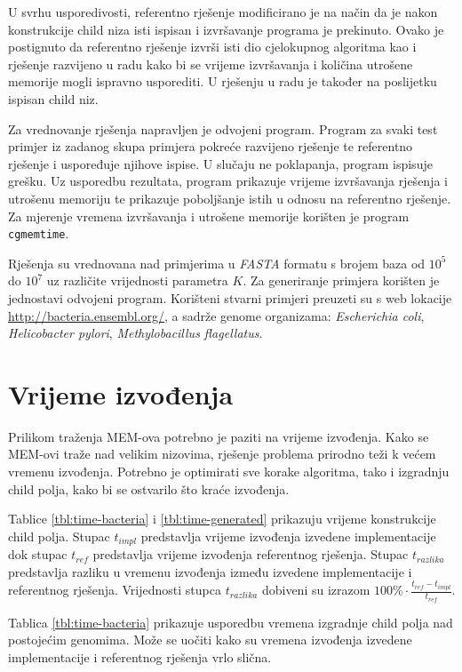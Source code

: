 \documentclass[times, utf8, seminar, numeric]{fer}
\begin{document}
U svrhu usporedivosti, referentno rješenje modificirano je na način da je nakon konstrukcije child niza isti ispisan i izvršavanje programa je prekinuto. Ovako je postignuto da referentno rješenje izvrši isti dio cjelokupnog algoritma kao i rješenje razvijeno u radu kako bi se vrijeme izvršavanja i količina utrošene memorije mogli ispravno usporediti. U rješenju u radu je također na poslijetku ispisan child niz. 

Za vrednovanje rješenja napravljen je odvojeni program. Program za svaki test primjer iz zadanog skupa primjera pokreće razvijeno rješenje te referentno rješenje i uspoređuje njihove ispise. U slučaju ne poklapanja, program ispisuje grešku. Uz usporedbu rezultata, program prikazuje vrijeme izvršavanja rješenja i utrošenu memoriju te prikazuje poboljšanje istih u odnosu na referentno rješenje. Za mjerenje vremena izvršavanja i utrošene memorije korišten je program \texttt{cgmemtime}.

Rješenja su vrednovana nad primjerima u \textit{FASTA} formatu s brojem baza od $10^5$ do $10^7$ uz različite vrijednosti parametra $K$. Za generiranje primjera korišten je jednostavi odvojeni program. Korišteni stvarni primjeri preuzeti su s web lokacije \url{http://bacteria.ensembl.org/}, a sadrže genome organizama: \textit{Escherichia coli}, \textit{Helicobacter pylori}, \textit{Methylobacillus flagellatus}.

\section{Vrijeme izvođenja}

Prilikom traženja MEM-ova potrebno je paziti na vrijeme izvođenja. Kako se MEM-ovi traže nad velikim nizovima, rješenje problema prirodno teži k većem vremenu izvođenja. Potrebno je optimirati sve korake algoritma, tako i izgradnju child polja, kako bi se ostvarilo što kraće izvođenja. 

Tablice \ref{tbl:time-bacteria} i \ref{tbl:time-generated} prikazuju vrijeme konstrukcije child polja. Stupac $t_{impl}$  predstavlja vrijeme izvođenja izvedene implementacije dok stupac $t_{ref}$ predstavlja vrijeme izvođenja referentnog rješenja. Stupac $t_{razlika}$ predstavlja razliku u vremenu izvođenja između izvedene implementacije i referentnog rješenja. Vrijednosti stupca $t_{razlika}$ dobiveni su izrazom $100\% \cdot \frac{t_{ref} - t_{impl}}{t_{ref}}$.

Tablica \ref{tbl:time-bacteria} prikazuje usporedbu vremena izgradnje child polja nad postojećim genomima. Može se uočiti kako su vremena izvođenja izvedene implementacije i referentnog rješenja vrlo slična. 
\end{document}
